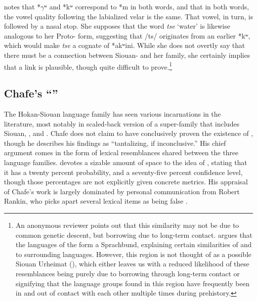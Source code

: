 \documentclass[output=paper]{LSP/langsci}
\begin{document}
\citet{Haas1951,Haas1952} notes that *$\gamma$ʷ and *kʷ correspond to  *m in both words, and that in both words, the vowel quality following the labialized velar is the same. That vowel, in turn, is followed by a nasal stop. She supposes that the  word \emph{tse} `water' is likewise analogous to her Proto- form, suggesting that  /ts/ originates from an earlier *kʷ, which would make  \emph{tse} a cognate of *akʷini. While she does not overtly say that there must be a connection between Siouan- and her  family, she certainly implies that a link is plausible, though quite difficult to prove.\footnote{An anonymous reviewer points out that this similarity may not be due to common genetic descent, but borrowing due to long-term contact. \citet{Kaufman2014} argues that the languages of the  form a Sprachbund, explaining certain similarities of  and  to surrounding languages. However, this region is not thought of as a possible Siouan Urheimat (\citealt[104]{ParksRankin2001}), which either leaves us with a reduced likelihood of these resemblances being purely due to borrowing through long-term contact or signifying that the language groups found in this region have frequently been in and out of contact with each other multiple times during prehistory.}

\subsection{Chafe's ``''}

The Hokan-Siouan language family has seen various incarnations in the literature, most notably in  scaled-back version of a super-family that includes Siouan, , and . Chafe does not claim to have conclusively proven the existence of , though he describes his findings as ``tantalizing, if inconclusive.'' His chief argument comes in the form of lexical resemblances shared between the three language families. \citet{Campbell2000} devotes a sizable amount of space to the idea of , stating that it has a twenty percent probability, and a seventy-five percent confidence level, though those percentages are not explicitly given concrete metrics. His appraisal of Chafe's work is largely dominated by personal communication from Robert Rankin, who picks apart several lexical items as being false .
\end{document}
